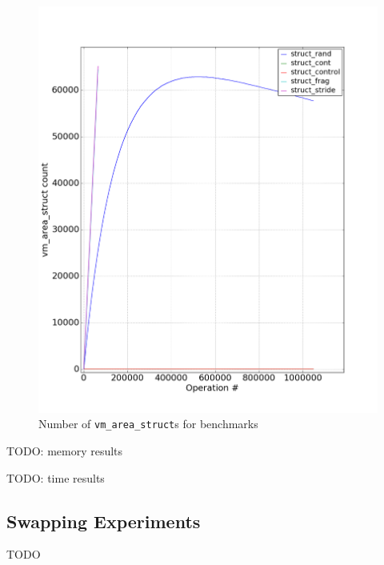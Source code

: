 \documentclass[twocolumn,11pt]{article}
\begin{document}
\begin{figure}
    \includegraphics[width=\columnwidth]{figures/vm_area_struct_count}
    \caption{Number of \texttt{vm\_area\_struct}s for benchmarks}
\end{figure}

TODO: memory results

TODO: time results

\subsection{Swapping Experiments}

TODO

{}

\end{document}
